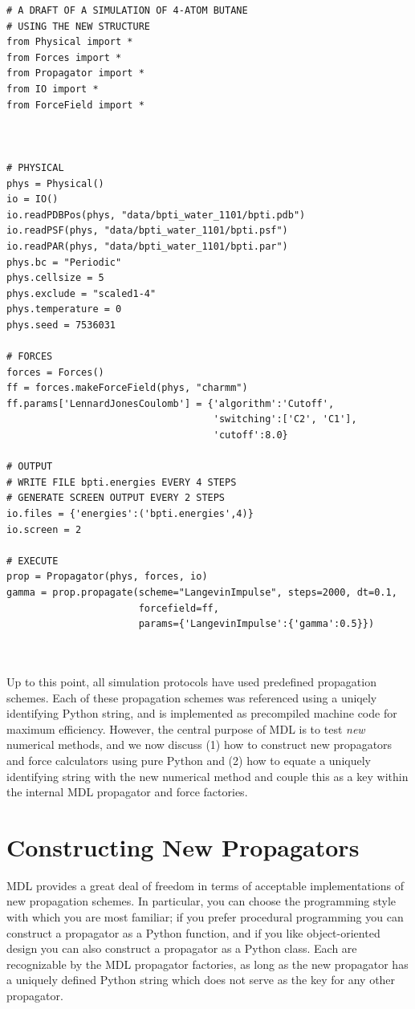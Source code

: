\documentclass[11pt]{report}
\begin{document}
\begin{verbatim}
# A DRAFT OF A SIMULATION OF 4-ATOM BUTANE
# USING THE NEW STRUCTURE
from Physical import *
from Forces import *
from Propagator import *
from IO import *
from ForceField import *



# PHYSICAL
phys = Physical()
io = IO()
io.readPDBPos(phys, "data/bpti_water_1101/bpti.pdb")
io.readPSF(phys, "data/bpti_water_1101/bpti.psf")
io.readPAR(phys, "data/bpti_water_1101/bpti.par")
phys.bc = "Periodic"
phys.cellsize = 5
phys.exclude = "scaled1-4"
phys.temperature = 0
phys.seed = 7536031

# FORCES
forces = Forces()
ff = forces.makeForceField(phys, "charmm")
ff.params['LennardJonesCoulomb'] = {'algorithm':'Cutoff',
                                    'switching':['C2', 'C1'],
                                    'cutoff':8.0}

# OUTPUT
# WRITE FILE bpti.energies EVERY 4 STEPS
# GENERATE SCREEN OUTPUT EVERY 2 STEPS
io.files = {'energies':('bpti.energies',4)}
io.screen = 2

# EXECUTE
prop = Propagator(phys, forces, io)
gamma = prop.propagate(scheme="LangevinImpulse", steps=2000, dt=0.1, 
                       forcefield=ff,
                       params={'LangevinImpulse':{'gamma':0.5}})



\end{verbatim}

Up to this point, all simulation protocols have used predefined propagation schemes.
Each of these propagation schemes was referenced using a uniqely identifying Python
string, and is implemented as precompiled machine code
for maximum efficiency.  However, the central purpose of MDL is to test {\it new}
numerical methods, and we now discuss (1) how to construct new propagators and
force calculators using pure Python and (2) how to equate a uniquely identifying
string with the new numerical method and couple this as a key within the internal
MDL propagator and force factories.


\chapter{Constructing New Propagators}

MDL provides a great deal of freedom in terms of acceptable implementations
of new propagation schemes.  In particular, you can choose the programming
style with which you are most familiar; if you prefer procedural programming
you can construct a propagator as a Python function, and if you like 
object-oriented design you can also construct a propagator as a Python class.
Each are recognizable by the MDL propagator factories, as long as the new
propagator has a uniquely defined Python string which does not serve as the
key for any other propagator.
\end{document}
